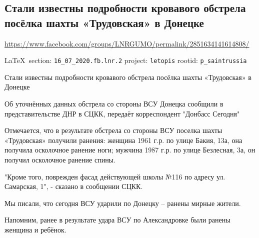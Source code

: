  
 
  
 
\subsection{Стали известны подробности кровавого обстрела посёлка шахты «Трудовская» в Донецке}
\url{https://www.facebook.com/groups/LNRGUMO/permalink/2851634141614808/}

\vspace{0.5cm}
{\ifDEBUG\small\LaTeX~section: \verb|16_07_2020.fb.lnr.2| project: \verb|letopis| rootid: \verb|p_saintrussia|\fi}
\vspace{0.5cm}

Стали известны подробности кровавого обстрела посёлка шахты «Трудовская» в
Донецке

Об уточнённых данных обстрела со стороны ВСУ Донецка сообщили в
представительстве ДНР в СЦКК, передаёт корреспондент "Донбасс Сегодня"

Отмечается, что в результате обстрела со стороны ВСУ поселка шахты «Трудовская»
получили ранения: женщина 1961 г.р. по улице Бакия, 13а, она получила
осколочное ранение ноги; мужчина 1987 г.р. по улице Безлесная, 3а, он получил
осколочное ранение спины.

"Кроме того, поврежден фасад действующей школы №116 по адресу ул. Самарская,
1", - сказано в сообщении СЦКК.

Мы писали, что сегодня ВСУ ударили по Донецку – ранены мирные жители.

Напомним, ранее в результате удара ВСУ по Александровке были ранены женщина и
ребёнок.
